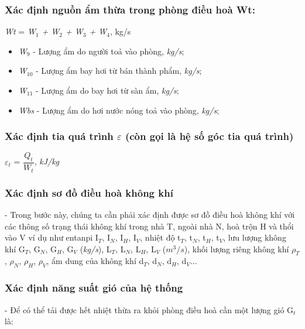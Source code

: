 \subsubsection{Xác định nguồn ẩm thừa trong phòng điều hoà W{\footnotesize t}:}

\begin{center}
	\textit{W{\footnotesize t}} = \textit{W$ _{1} $ + W$ _{2} $ + W$ _{3} $ + W$ _{4} $}, kg/s
\end{center}

\begin{itemize}[leftmargin = 3cm, label = $\ast$]
	\item \textit{W$ _{9} $} - Lượng ẩm do người toả vào phòng, \textit{kg/s};
	
	\item \textit{W$ _{10} $} - Lượng ẩm bay hơi từ bán thành phẩm, \textit{kg/s};

	\item \textit{W$ _{11} $} - Lượng ẩm do bay hơi từ sàn ẩm, \textit{kg/s};
	
	\item \textit{W{\footnotesize bs}} - Lượng ẩm do hơi nước nóng toả vào phòng, \textit{kg/s};	
\end{itemize}
	
\subsubsection{Xác định tia quá trình {\Large $\varepsilon$} (còn gọi là hệ số góc tia quá trình)}
\begin{center}
	{\Large $\varepsilon_{t}$} = $ \dfrac{Q_{t}}{W_{t}} $, \textit{kJ/kg}
\end{center}

\subsubsection{Xác định sơ đồ điều hoà không khí}
- Trong bước này, chúng ta cần phải xác định được sơ đồ điều hoà không khí với các thông số trạng thái không khí trong nhà T, ngoài nhà N, hoà trộn H và thổi vào V ví dụ như entanpi I$_{T}$, I$_{N}$, I$_{H}$, I$_{V}$, nhiệt độ t$_{T}$, t$_{N}$, t$_{H}$, t$_{V}$, lưu lượng không khí G$_{T}$, G$_{N}$, G$_{H}$, G$_{V}$ (\textit{kg/s}), L$_{T}$, L$_{N}$, L$_{H}$, L$_{V}$ (\textit{$m^3/s$}), khối lượng riêng không khí $\rho_{T}$, $\rho_{N}$, $\rho_{H}$, $\rho_{V}$, ẩm dung của không khí d$_{T}$, d$_{N}$, d$_{H}$, d$_{V}$...

\subsubsection{Xác định năng suất gió của hệ thống}
- Để có thể tải được hết nhiệt thừa ra khỏi phòng điều hoà cần một lượng gió G$_{t}$ là:

